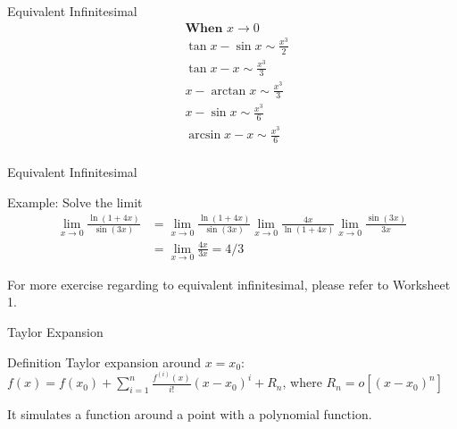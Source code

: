 \begin{frame}{Equivalent Infinitesimal}
	$$
		\begin{aligned}
			 & \textbf{When } x \rightarrow 0     \\
			 & \tan x-\sin x \sim \frac{x^{3}}{2} \\
			 & \tan x-x \sim \frac{x^{3}}{3}      \\
			 & x-\arctan x \sim \frac{x^{3}}{3}   \\
			 & x-\sin x \sim \frac{x^{3}}{6}      \\
			 & \arcsin x-x \sim \frac{x^{3}}{6}   \\
		\end{aligned}
	$$
\end{frame}





\begin{frame}{Equivalent Infinitesimal}
	\begin{block}{Example: Solve the limit}
		$$
			\begin{aligned}
				\lim _{x \rightarrow 0} \frac{\ln (1+4 x)}{\sin (3 x)} & =\lim _{x \rightarrow 0} \frac{\ln (1+4 x)}{\sin (3 x)} \lim _{x \rightarrow 0} \frac{4 x}{\ln (1+4 x)} \lim _{x \rightarrow 0} \frac{\sin (3 x)}{3 x} \\&=\lim _{x \rightarrow 0} \frac{4 x}{3 x}=4 / 3
			\end{aligned}
		$$
	\end{block}
	For more exercise regarding to equivalent infinitesimal, please refer to Worksheet 1.
\end{frame}



\begin{frame}{Taylor Expansion}
	\begin{block}{Definition}
		Taylor expansion around $x=x_0$:\\
		$f(x)=f(x_0)+\sum\limits_{i=1}^n\frac{f^{(i)}(x)}{i!}(x-x_0)^i+R_n$, where $R_n=o[(x-x_0)^n]$\\
	\end{block}

	It simulates a function around a point with a polynomial function.
\end{frame}




